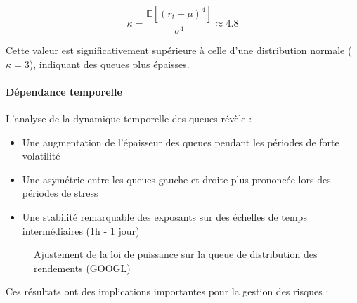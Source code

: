 \documentclass[12pt,a4paper]{article}
\theoremstyle{definition}
\theoremstyle{remark}
\begin{document}
\begin{equation}
\kappa = \frac{\mathbb{E}[(r_t - \mu)^4]}{\sigma^4} \approx 4.8
\end{equation}

Cette valeur est significativement supérieure à celle d'une distribution normale ($\kappa = 3$), indiquant des queues plus épaisses.

\paragraph{Dépendance temporelle}
L'analyse de la dynamique temporelle des queues révèle :

\begin{itemize}
    \item Une augmentation de l'épaisseur des queues pendant les périodes de forte volatilité
    \item Une asymétrie entre les queues gauche et droite plus prononcée lors des périodes de stress
    \item Une stabilité remarquable des exposants sur des échelles de temps intermédiaires (1h - 1 jour)
\end{itemize}

\begin{figure}[h!]
\centering
{}
\caption{Ajustement de la loi de puissance sur la queue de distribution des rendements (GOOGL)}
\end{figure}

Ces résultats ont des implications importantes pour la gestion des risques :
\end{document}
